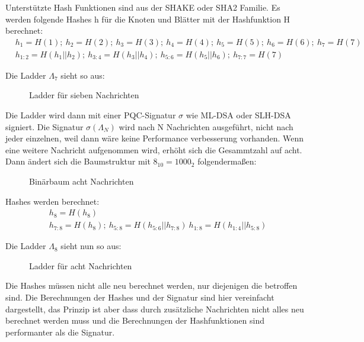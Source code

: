 Unterstützte Hash Funktionen sind aus der SHAKE oder SHA2 Familie.\cite{harveyMerkleTreeLadder2026}
Es werden folgende Hashes h für die Knoten und Blätter mit der Hashfunktion H berechnet:
\begin{align}
&h_{1}=H(1);\ h_{2}=H(2);\ h_{3}=H(3);\ h_{4}=H(4);\ h_{5}=H(5);\ h_{6}=H(6);\ h_{7}=H(7)\\
&h_{1:2}=H(h_{1}||h_{2});\ h_{3:4}=H(h_{3}||h_{4});\ h_{5:6}=H(h_{5}||h_{6});\ h_{7:7}=H(7)
\end{align}
\cite{cooperRecommendationStatefulHashBased2020a}

Die Ladder $\Lambda_{7}$ sieht so aus:
\begin{figure}[hbtp]
    \centering
    \siebenLadder
    \caption{Ladder für sieben Nachrichten}
    \label{Ladder sieben Nachrichten}
\end{figure}

Die Ladder wird dann mit einer PQC-Signatur $\sigma$ wie ML-DSA oder SLH-DSA signiert. Die Signatur $\sigma(\Lambda_{N})$ wird nach N Nachrichten ausgeführt, nicht nach jeder einzelnen, weil dann wäre keine Performance verbesserung vorhanden.
Wenn eine weitere Nachricht aufgenommen wird, erhöht sich die Gesammtzahl auf acht. Dann ändert sich die Baumstruktur mit $8_{10} = 1000_{2}$ folgendermaßen:

\begin{figure}[htbp]
    \centering
    \achtErsterBaum
    \caption{Binärbaum acht Nachrichten}
    \label{achtBaum}
\end{figure}

Hashes werden berechnet:
\begin{align}
    &h_8=H(h_8)\\
    &h_{7:8}=H(h_8);\ h_{5:8}=H(h_{5:6}||h_{7:8})\ h_{1:8}=H(h_{1:4}||h_{5:8})
\end{align}

Die Ladder $\Lambda_{8}$ sieht nun so aus:
\begin{figure}[hbtp]
    \centering
    \achtLadder
    \caption{Ladder für acht Nachrichten}
    \label{achtLadder}
\end{figure}

Die Hashes müssen nicht alle neu berechnet werden, nur diejenigen die betroffen sind. Die Berechnungen der Hashes und der Signatur sind hier vereinfacht dargestellt, das Prinzip ist aber dass durch zusätzliche Nachrichten nicht alles neu berechnet werden muss
und die Berechnungen der Hashfunktionen sind performanter als die Signatur.